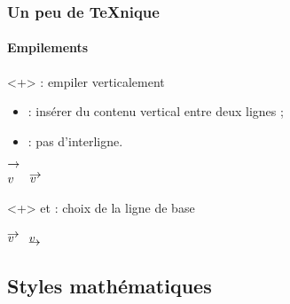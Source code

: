 \documentclass[10pt, aspectratio=3218]{beamer}
\begin{document}
\begin{frame}[fragile]

\frametitle{Un peu de \TeX{}nique}
\framesubtitle{Empilements}

\begin{block}<+>{ : empiler verticalement}
  \begin{itemize}
   \item {} : insérer du contenu vertical entre deux lignes ;\par
   \item {} : pas d'interligne.
  \end{itemize}
  \begin{dispExample}
$ \vbox{\ialign{#\crcr $\rightarrow$ \crcr $v$ \crcr }} $ \qquad
$ \vbox{\ialign{#\crcr $\mskip -1mu \rightarrow$ \crcr
    \noalign{\kern -0.7pt\nointerlineskip} $v$ \crcr}} $
  \end{dispExample}
\end{block}

\begin{block}<+>{ et  : choix de la ligne de base}
  \begin{dispExample}
$ \vbox{\ialign{#\crcr $\mskip -1mu \rightarrow$ \crcr
    \noalign{\kern -0.7pt\nointerlineskip} $v$ \crcr}} $ \qquad
$ \vtop{\ialign{#\crcr $v$ \crcr
    \noalign{\kern -0.7pt\nointerlineskip}
    $\mskip -1mu \rightarrow$ \crcr}} $
  \end{dispExample}
\end{block}

\end{frame}

\subsection{Styles mathématiques}
\end{document}
